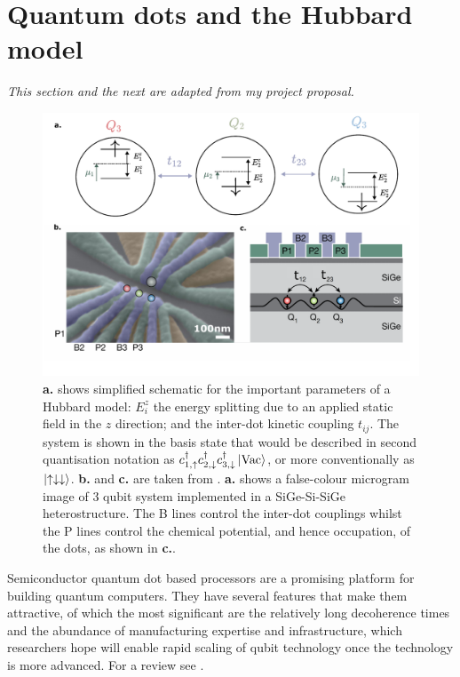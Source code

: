 \documentclass{report}
\begin{document}
\section{Quantum dots and the Hubbard model}\label{sec:hubbard_model}
\textit{This section and the next are adapted from my project proposal.}
\begin{figure}[ht]
    \centering
    \includegraphics[scale = 0.7]{Figures/3qubithubbard.pdf}
    \caption{\textbf{a.} shows simplified schematic for the important parameters of a Hubbard model: $E_i^z$ the energy splitting due to an applied static field in the $z$ direction; and the inter-dot kinetic coupling $t_{ij}$. The system is shown in the basis state that would be described in second quantisation notation as $c_{1,\uparrow}^\dagger c_{2,\downarrow}^\dagger c_{3,\downarrow}^\dagger\ket{\text{Vac}}$, or more conventionally as $\ket{\uparrow\downarrow\downarrow}$. \textbf{b.} and \textbf{c.} are taken from \cite{Takeda2022}. \textbf{a.} shows a false-colour microgram image of 3 qubit system implemented in a SiGe-Si-SiGe heterostructure. The B lines control the inter-dot couplings whilst the P lines control the chemical potential, and hence occupation, of the dots, as shown in \textbf{c.}.}
    \label{fig:3qubitdiagram}
\end{figure}

Semiconductor quantum dot based processors are a promising platform for building quantum computers. They have several features that make them attractive, of which the most significant are the relatively long decoherence times \cite{Loss2022} and the abundance of manufacturing expertise and infrastructure, which researchers hope will enable rapid scaling of qubit technology once the technology is more advanced. For a review see \cite{Burkard2022}. 
\end{document}

